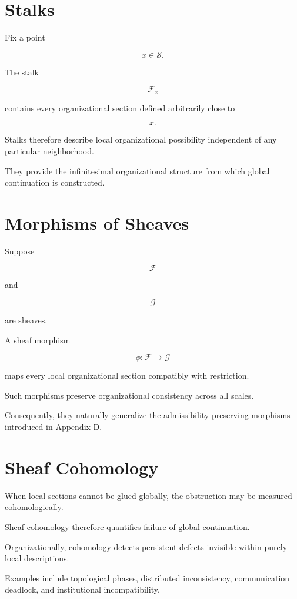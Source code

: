 \documentclass[11pt,oneside]{book}
\numberwithin{equation}{chapter}
\theoremstyle{definition}
\theoremstyle{plain}
\begin{document}
\section{Stalks}

Fix a point

\[
x
\in
\mathcal S.
\]

The stalk

\[
\mathcal F_x
\]

contains every organizational section defined arbitrarily close to

\[
x.
\]

Stalks therefore describe local organizational possibility independent of
any particular neighborhood.

They provide the infinitesimal organizational structure from which global
continuation is constructed.

\section{Morphisms of Sheaves}

Suppose

\[
\mathcal F
\]

and

\[
\mathcal G
\]

are sheaves.

A sheaf morphism

\[
\phi
:
\mathcal F
\rightarrow
\mathcal G
\]

maps every local organizational section compatibly with restriction.

Such morphisms preserve organizational consistency across all scales.

Consequently, they naturally generalize the admissibility-preserving
morphisms introduced in Appendix D.

\section{Sheaf Cohomology}

When local sections cannot be glued globally, the obstruction may be
measured cohomologically.

Sheaf cohomology therefore quantifies failure of global continuation.

Organizationally, cohomology detects persistent defects invisible within
purely local descriptions.

Examples include topological phases, distributed inconsistency,
communication deadlock, and institutional incompatibility.
\end{document}
